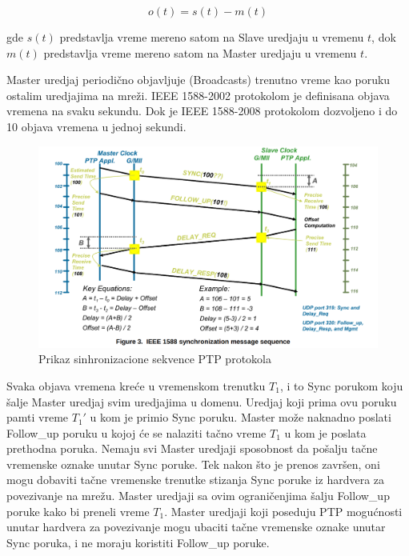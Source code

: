 \documentclass[a4paper,12pt, master]{etf}
\begin{document}
	\begin{equation}
		o(t) = s(t) - m(t)
	\end{equation}

	gde $s(t)$ predstavlja vreme mereno satom na Slave uredjaju u vremenu $t$,
	dok $m(t)$ predstavlja vreme mereno satom na Master uredjaju u vremenu $t$.

	Master uredjaj periodi\v{c}no objavljuje (Broadcasts) trenutno vreme kao
	poruku ostalim uredjajima na mre\v{z}i. IEEE 1588-2002 protokolom je
	definisana objava vremena na svaku sekundu. Dok je IEEE 1588-2008
	protokolom dozvoljeno i do 10 objava vremena u jednoj sekundi.

	\begin{figure}[htb]
			\centering
			\includegraphics[scale=.3]{../pic/ieee_1588_sync_sequence.png}
			\caption{Prikaz sinhronizacione sekvence PTP protokola}
			\label{fig:ieee_1588_sync_sequence}
	\end{figure}

	Svaka objava vremena kre\'{c}e u vremenskom trenutku $T_1$, i to Sync
	porukom koju \v{s}alje Master uredjaj svim uredjajima u domenu. Uredjaj
	koji prima ovu poruku pamti vreme $T_1'$ u kom je primio Sync poruku.
	Master mo\v{z}e naknadno poslati Follow\_up poruku u kojoj \'{c}e se
	nalaziti ta\v{c}no vreme $T_1$ u kom je poslata prethodna poruka. Nemaju
	svi Master uredjaji sposobnost da po\v{s}alju ta\v{c}ne vremenske oznake
	unutar Sync poruke. Tek nakon \v{s}to je prenos zavr\v{s}en, oni mogu
	dobaviti ta\v{c}ne vremenske trenutke stizanja Sync poruke iz hardvera za
	povezivanje na mre\v{z}u. Master uredjaji sa ovim ograni\v{c}enjima
	\v{s}alju Follow\_up poruke kako bi preneli vreme $T_1$. Master uredjaji
	koji poseduju PTP mogu\'{c}nosti unutar hardvera za povezivanje mogu
	ubaciti ta\v{c}ne vremenske oznake unutar Sync poruka, i ne moraju
	koristiti Follow\_up poruke.
\end{document}
